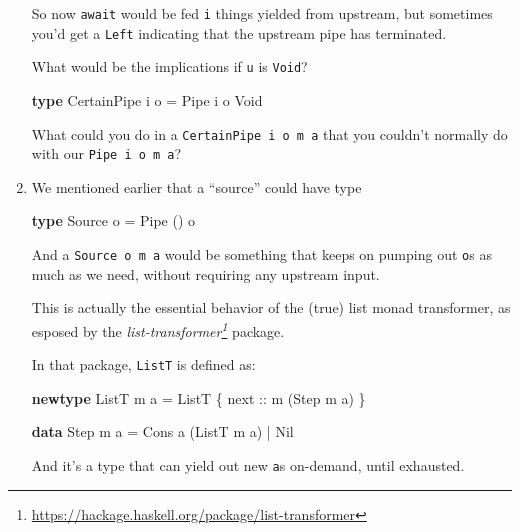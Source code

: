 \documentclass[]{article}
\newenvironment{Shaded}{}{}
\newcommand{\DataTypeTok}[1]{\textcolor[rgb]{0.56,0.13,0.00}{#1}}
\newcommand{\KeywordTok}[1]{\textcolor[rgb]{0.00,0.44,0.13}{\textbf{#1}}}
\newcommand{\NormalTok}[1]{#1}
\newcommand{\OperatorTok}[1]{\textcolor[rgb]{0.40,0.40,0.40}{#1}}
\newcommand{\OtherTok}[1]{\textcolor[rgb]{0.00,0.44,0.13}{#1}}
\renewcommand{\href}[2]{#2\footnote{\url{#1}}}
\begin{document}
\begin{enumerate}
  So now \texttt{await} would be fed \texttt{i} things yielded from upstream,
  but sometimes you'd get a \texttt{Left} indicating that the upstream pipe has
  terminated.

  What would be the implications if \texttt{u} is \texttt{Void}?

\begin{Shaded}
\begin{Highlighting}[]
\KeywordTok{type} \DataTypeTok{CertainPipe}\NormalTok{ i o }\OtherTok{=} \DataTypeTok{Pipe}\NormalTok{ i o }\DataTypeTok{Void}
\end{Highlighting}
\end{Shaded}

  What could you do in a \texttt{CertainPipe\ i\ o\ m\ a} that you couldn't
  normally do with our \texttt{Pipe\ i\ o\ m\ a}?
\item
  We mentioned earlier that a ``source'' could have type

\begin{Shaded}
\begin{Highlighting}[]
\KeywordTok{type} \DataTypeTok{Source}\NormalTok{ o }\OtherTok{=} \DataTypeTok{Pipe}\NormalTok{ () o}
\end{Highlighting}
\end{Shaded}

  And a \texttt{Source\ o\ m\ a} would be something that keeps on pumping out
  \texttt{o}s as much as we need, without requiring any upstream input.

  This is actually the essential behavior of the (true) list monad transformer,
  as esposed by the
  \emph{\href{https://hackage.haskell.org/package/list-transformer}{list-transformer}}
  package.

  In that package, \texttt{ListT} is defined as:

\begin{Shaded}
\begin{Highlighting}[]
\KeywordTok{newtype} \DataTypeTok{ListT}\NormalTok{ m a }\OtherTok{=} \DataTypeTok{ListT}\NormalTok{ \{}\OtherTok{ next ::}\NormalTok{ m (}\DataTypeTok{Step}\NormalTok{ m a) \}}

\KeywordTok{data} \DataTypeTok{Step}\NormalTok{ m a }\OtherTok{=} \DataTypeTok{Cons}\NormalTok{ a (}\DataTypeTok{ListT}\NormalTok{ m a) }\OperatorTok{|} \DataTypeTok{Nil}
\end{Highlighting}
\end{Shaded}

  And it's a type that can yield out new \texttt{a}s on-demand, until exhausted.


\end{enumerate}
\end{document}
